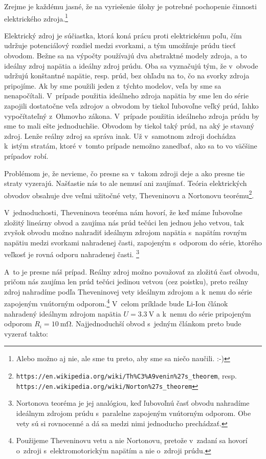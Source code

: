 Zrejme je každému jasné, že na vyriešenie úlohy je potrebné pochopenie
činnosti elektrického zdroja.\footnote{Alebo možno aj nie, ale sme tu preto, aby sme sa niečo naučili. :-)}

Elektrický zdroj je súčiastka, ktorá koná prácu proti elektrickému
poľu, čím udržuje potenciálový rozdiel medzi svorkami, a tým umožňuje
prúdu tiecť obvodom. Bežne sa na výpočty používajú dva abstraktné
modely zdroja, a to ideálny zdroj napätia a ideálny zdroj prúdu. Oba
sa vyznačujú tým, že v~obvode udržujú konštantné napätie, resp. prúd,
bez ohľadu na to, čo na svorky zdroja pripojíme. Ak by sme použili
jeden z~týchto modelov, veľa by sme sa nenapočítali. V~prípade použitia
ideálneho zdroja napätia by sme len do série zapojili dostatočne veľa
zdrojov a obvodom by tiekol ľubovoľne veľký prúd, ľahko vypočítateľný
z~Ohmovho zákona. V~prípade použitia ideálneho zdroja prúdu by sme
to mali ešte jednoduchšie. Obvodom by tiekol taký prúd, na aký je
stavaný zdroj. Lenže reálny zdroj sa správa inak. Už v~samotnom zdroji
dochádza k~istým stratám, ktoré v~tomto prípade nemožno zanedbať,
ako sa to vo väčšine prípadov robí.

Problémom je, že nevieme, čo presne sa v~takom zdroji deje a ako presne
tie straty vyzerajú. Našťastie nás to ale nemusí ani zaujímať. Teória
elektrických obvodov obsahuje dve veľmi užitočné vety, Theveninovu
a Nortonovu teorému\footnote{\texttt{https://en.wikipedia.org/wiki/Th\%C3\%A9venin\%27s\_theorem}, resp.
\texttt{https://en.wikipedia.org/wiki/Norton\newline\%27s\_theorem}}. 

V~jednoduchosti, Theveninova teoréma nám hovorí, že keď máme ľubovoľne
zložitý lineárny obvod a zaujíma nás prúd tečúci len jednou jeho vetvou,
tak zvyšok obvodu možno nahradiť ideálnym zdrojom napätia s~napätím rovným 
napätiu medzi svorkami nahradenej časti, zapojeným s~odporom do série,
ktorého veľkosť je rovná odporu nahradenej časti.
\footnote{Nortonova teoréma je jej analógiou, keď ľubovoľnú časť obvodu nahradíme 
ideálnym zdrojom prúdu s~paralelne zapojeným vnútorným odporom. Obe
vety sú si rovnocenné a dá sa medzi nimi jednoducho prechádzať.} 

A~to je presne náš prípad. Reálny zdroj možno považovať za zložitú
časť obvodu, pričom nás zaujíma len prúd tečúci jedinou vetvou (cez
poistku), preto reálny zdroj nahradíme podľa Theveninovej vety ideálnym
zdrojom a k~nemu do série zapojeným vnútorným odporom.\footnote{Použijeme Theveninovu vetu a nie Nortonovu, pretože v~zadaní sa hovorí o~zdroji s~elektromotorickým napätím a nie o~zdroji prúdu.} V~celom príklade bude Li-Ion článok nahradený ideálnym zdrojom napätia
$U=\SI{3.3}{\volt}$ a k~nemu do série pripojeným odporom $R_{i}=\SI{10}{\milli\ohm}$.
Najjednoduchší obvod s~jedným článkom preto bude vyzerať takto:

